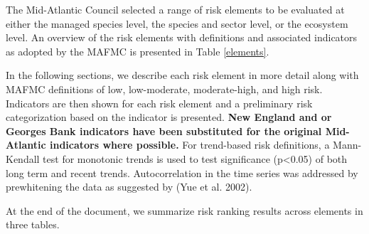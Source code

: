 \documentclass[11pt,]{article}
\begin{document}
The Mid-Atlantic Council selected a range of risk elements to be
evaluated at either the managed species level, the species and sector
level, or the ecosystem level. An overview of the risk elements with
definitions and associated indicators as adopted by the MAFMC is
presented in Table \ref{elements}.

In the following sections, we describe each risk element in more detail
along with MAFMC definitions of low, low-moderate, moderate-high, and
high risk. Indicators are then shown for each risk element and a
preliminary risk categorization based on the indicator is presented.
\textbf{New England and or Georges Bank indicators have been substituted
for the original Mid-Atlantic indicators where possible.} For
trend-based risk definitions, a Mann-Kendall test for monotonic trends
is used to test significance (p\textless{}0.05) of both long term and
recent trends. Autocorrelation in the time series was addressed by
prewhitening the data as suggested by (Yue et al. 2002).

At the end of the document, we summarize risk ranking results across
elements in three tables.
\end{document}
